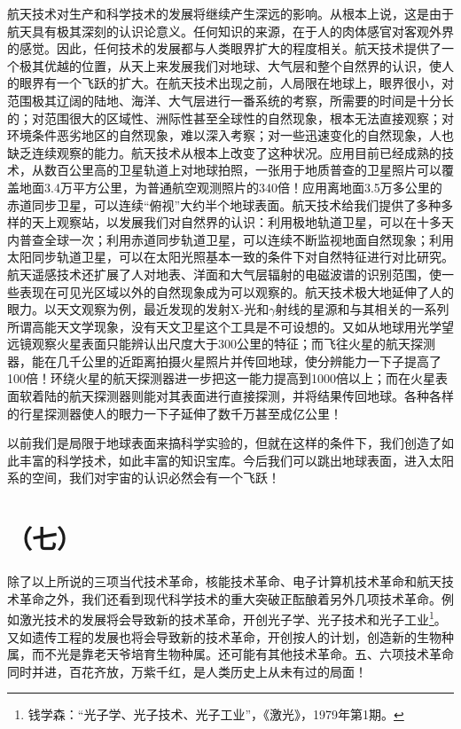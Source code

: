 航天技术对生产和科学技术的发展将继续产生深远的影响。从根本上说，这是由于航天具有极其深刻的认识论意义。任何知识的来源，在于人的肉体感官对客观外界的感觉。因此，任何技术的发展都与人类眼界扩大的程度相关。航天技术提供了一个极其优越的位置，从天上来发展我们对地球、大气层和整个自然界的认识，使人的眼界有一个飞跃的扩大。在航天技术出现之前，人局限在地球上，眼界很小，对范围极其辽阔的陆地、海洋、大气层进行一番系统的考察，所需要的时间是十分长的；对范围很大的区域性、洲际性甚至全球性的自然现象，根本无法直接观察；对环境条件恶劣地区的自然现象，难以深入考察；对一些迅速变化的自然现象，人也缺乏连续观察的能力。航天技术从根本上改变了这种状况。应用目前已经成熟的技术，从数百公里高的卫星轨道上对地球拍照，一张用于地质普查的卫星照片可以覆盖地面3.4万平方公里，为普通航空观测照片的340倍！应用离地面3.5万多公里的赤道同步卫星，可以连续“俯视”大约半个地球表面。航天技术给我们提供了多种多样的天上观察站，以发展我们对自然界的认识：利用极地轨道卫星，可以在十多天内普查全球一次；利用赤道同步轨道卫星，可以连续不断监视地面自然现象；利用太阳同步轨道卫星，可以在太阳光照基本一致的条件下对自然特征进行对比研究。航天遥感技术还扩展了人对地表、洋面和大气层辐射的电磁波谱的识别范围，使一些表现在可见光区域以外的自然现象成为可以观察的。航天技术极大地延伸了人的眼力。以天文观察为例，最近发现的发射X-光和$\gamma$射线的星源和与其相关的一系列所谓高能天文学现象，没有天文卫星这个工具是不可设想的。又如从地球用光学望远镜观察火星表面只能辨认出尺度大于300公里的特征；而飞往火星的航天探测器，能在几千公里的近距离拍摄火星照片并传回地球，使分辨能力一下子提高了100倍！环绕火星的航天探测器进一步把这一能力提高到1000倍以上；而在火星表面软着陆的航天探测器则能对其表面进行直接探测，并将结果传回地球。各种各样的行星探测器使人的眼力一下子延伸了数千万甚至成亿公里！

以前我们是局限于地球表面来搞科学实验的，但就在这样的条件下，我们创造了如此丰富的科学技术，如此丰富的知识宝库。今后我们可以跳出地球表面，进入太阳系的空间，我们对宇宙的认识必然会有一个飞跃！

\section*{（七）}
除了以上所说的三项当代技术革命，核能技术革命、电子计算机技术革命和航天技术革命之外，我们还看到现代科学技术的重大突破正酝酿着另外几项技术革命。例如激光技术的发展将会导致新的技术革命，开创光子学、光子技术和光子工业\footnote{钱学森：“光子学、光子技术、光子工业”，《激光》，1979年第1期。}。又如遗传工程的发展也将会导致新的技术革命，开创按人的计划，创造新的生物种属，而不光是靠老天爷培育生物种属。还可能有其他技术革命。五、六项技术革命同时并进，百花齐放，万紫千红，是人类历史上从未有过的局面！

